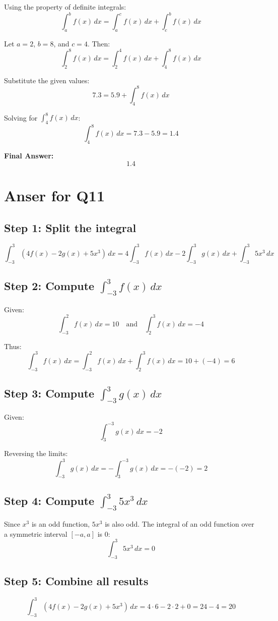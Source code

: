 \documentclass{article}
\begin{document}
Using the property of definite integrals:
\[
\int_a^b f(x)\,dx = \int_a^c f(x)\,dx + \int_c^b f(x)\,dx
\]

Let $a = 2$, $b = 8$, and $c = 4$. Then:
\[
\int_2^8 f(x)\,dx = \int_2^4 f(x)\,dx + \int_4^8 f(x)\,dx
\]

Substitute the given values:
\[
7.3 = 5.9 + \int_4^8 f(x)\,dx
\]

Solving for $\int_4^8 f(x)\,dx$:
\[
\int_4^8 f(x)\,dx = 7.3 - 5.9 = 1.4
\]

\noindent\textbf{Final Answer:}
\[
\boxed{1.4}
\]
\section*{Anser for Q11}
\subsection*{Step 1: Split the integral}
\[
\int_{-3}^3 \left(4f(x) - 2g(x) + 5x^3\right) \, dx 
= 4\int_{-3}^3 f(x) \, dx - 2\int_{-3}^3 g(x) \, dx + \int_{-3}^3 5x^3 \, dx
\]

\subsection*{Step 2: Compute \(\int_{-3}^3 f(x) \, dx\)}
Given:
\[
\int_{-3}^2 f(x) \, dx = 10 \quad \text{and} \quad \int_2^3 f(x) \, dx = -4
\]

Thus:
\[
\int_{-3}^3 f(x) \, dx = \int_{-3}^2 f(x) \, dx + \int_2^3 f(x) \, dx = 10 + (-4) = 6
\]

\subsection*{Step 3: Compute \(\int_{-3}^3 g(x) \, dx\)}
Given:
\[
\int_3^{-3} g(x) \, dx = -2
\]

Reversing the limits:
\[
\int_{-3}^3 g(x) \, dx = -\int_3^{-3} g(x) \, dx = -(-2) = 2
\]

\subsection*{Step 4: Compute \(\int_{-3}^3 5x^3 \, dx\)}
Since \(x^3\) is an odd function, \(5x^3\) is also odd. The integral of an odd function over a symmetric interval \([-a, a]\) is 0:
\[
\int_{-3}^3 5x^3 \, dx = 0
\]

\subsection*{Step 5: Combine all results}
\[
\int_{-3}^3 \left(4f(x) - 2g(x) + 5x^3\right) \, dx 
= 4 \cdot 6 - 2 \cdot 2 + 0
= 24 - 4
= 20
\]
\end{document}
